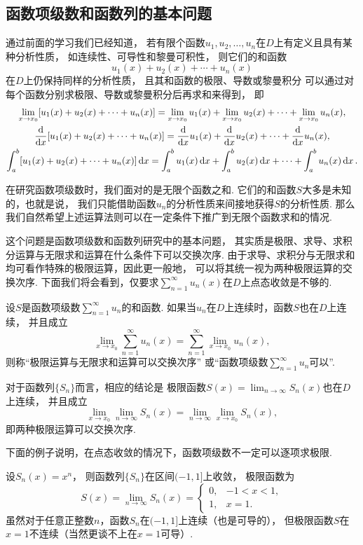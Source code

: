 \subsection{函数项级数和函数列的基本问题}
通过前面的学习我们已经知道，
若有限个函数\(u_1,u_2,\dotsc,u_n\)在\(D\)上有定义且具有某种分析性质，
如连续性、可导性和黎曼可积性，
则它们的和函数\[
	u_1(x) + u_2(x) + \dotsb + u_n(x)
\]在\(D\)上仍保持同样的分析性质，
且其和函数的极限、导数或黎曼积分
可以通过对每个函数分别求极限、导数或黎曼积分后再求和来得到，
即\begin{gather*}
	\lim_{x \to x_0} [u_1(x) + u_2(x) + \dotsb + u_n(x)]
	= \lim_{x \to x_0} u_1(x)
	+ \lim_{x \to x_0} u_2(x)
	+ \dotsb
	+ \lim_{x \to x_0} u_n(x), \\
	\dv{x} [u_1(x) + u_2(x) + \dotsb + u_n(x)]
	= \dv{x} u_1(x)
	+ \dv{x} u_2(x)
	+ \dotsb
	+ \dv{x} u_n(x), \\
	\int_a^b [u_1(x) + u_2(x) + \dotsb + u_n(x)] \dd{x}
	= \int_a^b u_1(x) \dd{x}
	+ \int_a^b u_2(x) \dd{x}
	+ \dotsb
	+ \int_a^b u_n(x) \dd{x}.
\end{gather*}

在研究函数项级数时，我们面对的是无限个函数之和.
它们的和函数\(S\)大多是未知的，也就是说，
我们只能借助函数\(u_n\)的分析性质来间接地获得\(S\)的分析性质.
那么我们自然希望上述运算法则可以在一定条件下推广到无限个函数求和的情况.

这个问题是函数项级数和函数列研究中的基本问题，
其实质是极限、求导、求积分运算与无限求和运算在什么条件下可以交换次序.
由于求导、求积分与无限求和均可看作特殊的极限运算，因此更一般地，
可以将其统一视为两种极限运算的交换次序.
下面我们将会看到，仅要求\(\sum_{n=1}^\infty u_n(x)\)在\(D\)上点态收敛是不够的.

\begin{definition}
设\(S\)是函数项级数\(\sum_{n=1}^\infty u_n\)的和函数.
如果当\(u_n\)在\(D\)上连续时，函数\(S\)也在\(D\)上连续，
并且成立\[
	\lim_{x \to x_0} \sum_{n=1}^\infty u_n(x)
	= \sum_{n=1}^\infty \lim_{x \to x_0} u_n(x),
\]
则称“极限运算与无限求和运算可以交换次序”
或“函数项级数\(\sum_{n=1}^\infty u_n\)可以”.
\end{definition}
对于函数列\(\{S_n\}\)而言，相应的结论是
极限函数\(S(x) = \lim_{n\to\infty} S_n(x)\)也在\(D\)上连续，
并且成立\[
	\lim_{x \to x_0} \lim_{n\to\infty} S_n(x)
	= \lim_{n\to\infty} \lim_{x \to x_0} S_n(x),
\]
即两种极限运算可以交换次序.

下面的例子说明，在点态收敛的情况下，函数项级数不一定可以逐项求极限.
\begin{example}\label{example:函数项级数.点态收敛情况下和函数可能不连续}
设\(S_n(x) = x^n\)，
则函数列\(\{S_n\}\)在区间\((-1,1]\)上收敛，
极限函数为\[
	S(x) = \lim_{n\to\infty} S_n(x)
	= \left\{ \begin{array}{ll}
		0, & -1<x<1, \\
		1, & x=1.
	\end{array} \right.
\]
虽然对于任意正整数\(n\)，函数\(S_n\)在\((-1,1]\)上连续（也是可导的），
但极限函数\(S\)在\(x=1\)不连续（当然更谈不上在\(x=1\)可导）.
\end{example}

